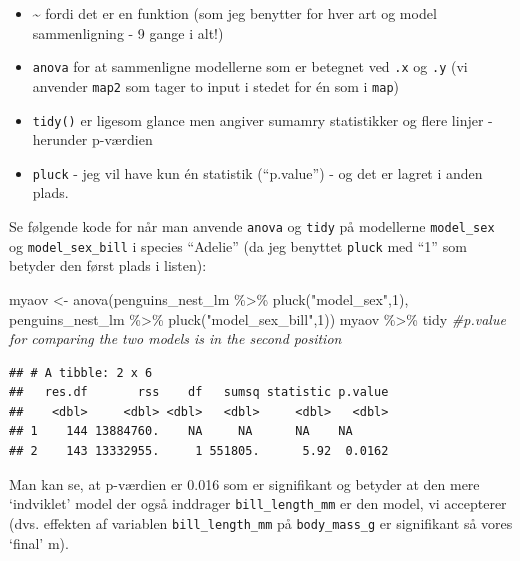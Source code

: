 \documentclass[
]{book}
\newenvironment{Shaded}{\begin{snugshade}}{\end{snugshade}}
\newcommand{\CommentTok}[1]{\textcolor[rgb]{0.56,0.35,0.01}{\textit{#1}}}
\newcommand{\DecValTok}[1]{\textcolor[rgb]{0.00,0.00,0.81}{#1}}
\newcommand{\FunctionTok}[1]{\textcolor[rgb]{0.00,0.00,0.00}{#1}}
\newcommand{\NormalTok}[1]{#1}
\newcommand{\OtherTok}[1]{\textcolor[rgb]{0.56,0.35,0.01}{#1}}
\newcommand{\SpecialCharTok}[1]{\textcolor[rgb]{0.00,0.00,0.00}{#1}}
\newcommand{\StringTok}[1]{\textcolor[rgb]{0.31,0.60,0.02}{#1}}
\providecommand{\tightlist}{%
  \setlength{\itemsep}{0pt}\setlength{\parskip}{0pt}}
\begin{document}
\begin{itemize}
\tightlist
\item
  \textasciitilde{} fordi det er en funktion (som jeg benytter for hver art og model sammenligning - 9 gange i alt!)
\item
  \texttt{anova} for at sammenligne modellerne som er betegnet ved \texttt{.x} og \texttt{.y} (vi anvender \texttt{map2} som tager to input i stedet for én som i \texttt{map})
\item
  \texttt{tidy()} er ligesom glance men angiver sumamry statistikker og flere linjer - herunder p-værdien
\item
  \texttt{pluck} - jeg vil have kun én statistik (``p.value'') - og det er lagret i anden plads.
\end{itemize}

Se følgende kode for når man anvende \texttt{anova} og \texttt{tidy} på modellerne \texttt{model\_sex} og \texttt{model\_sex\_bill} i species ``Adelie'' (da jeg benyttet \texttt{pluck} med ``1'' som betyder den først plads i listen):

\begin{Shaded}
\begin{Highlighting}[]
\NormalTok{myaov }\OtherTok{\textless{}{-}} \FunctionTok{anova}\NormalTok{(penguins\_nest\_lm }\SpecialCharTok{\%\textgreater{}\%} \FunctionTok{pluck}\NormalTok{(}\StringTok{"model\_sex"}\NormalTok{,}\DecValTok{1}\NormalTok{),}
\NormalTok{               penguins\_nest\_lm }\SpecialCharTok{\%\textgreater{}\%} \FunctionTok{pluck}\NormalTok{(}\StringTok{"model\_sex\_bill"}\NormalTok{,}\DecValTok{1}\NormalTok{))}
\NormalTok{myaov }\SpecialCharTok{\%\textgreater{}\%}\NormalTok{ tidy }\CommentTok{\#p.value for comparing the two models is in the second position}
\end{Highlighting}
\end{Shaded}

\begin{verbatim}
## # A tibble: 2 x 6
##   res.df       rss    df   sumsq statistic p.value
##    <dbl>     <dbl> <dbl>   <dbl>     <dbl>   <dbl>
## 1    144 13884760.    NA     NA      NA    NA     
## 2    143 13332955.     1 551805.      5.92  0.0162
\end{verbatim}

Man kan se, at p-værdien er 0.016 som er signifikant og betyder at den mere `indviklet' model der også inddrager \texttt{bill\_length\_mm} er den model, vi accepterer (dvs. effekten af variablen \texttt{bill\_length\_mm} på \texttt{body\_mass\_g} er signifikant så vores `final' m).
\end{document}
